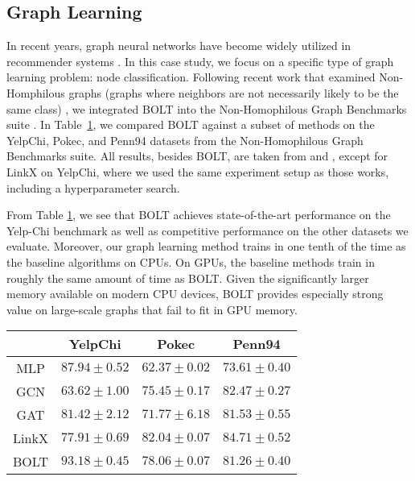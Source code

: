 \documentclass[sigconf]{acmart}
\begin{document}
\subsection{Graph Learning}
In recent years, graph neural networks have become widely utilized in recommender systems \cite{wu2022graph}. In this case study, we focus on a specific type of graph learning problem: node classification. Following recent work that examined Non-Homphilous graphs (graphs where neighbors are not necessarily likely to be the same class) \cite{lim2021large} \cite{lim2021new}, we integrated BOLT into the Non-Homophilous Graph Benchmarks suite \cite{lim2021large}. In Table~\ref{graph-learning}, we compared BOLT against a subset of methods on the YelpChi, Pokec, and Penn94 datasets from the Non-Homophilous Graph Benchmarks suite. All results, besides BOLT, are taken from \cite{lim2021large} and \cite{lim2021new}, except for LinkX on YelpChi, where we used the same experiment setup as those works, including a hyperparameter search. 

From Table \ref{graph-learning}, we see that BOLT achieves state-of-the-art performance on the Yelp-Chi benchmark as well as competitive performance on the other datasets we evaluate. Moreover, our graph learning method trains in one tenth of the time as the baseline algorithms on CPUs. On GPUs, the baseline methods train in roughly the same amount of time as BOLT. Given the significantly larger memory available on modern CPU devices, BOLT provides especially strong value on large-scale graphs that fail to fit in GPU memory.

\begin{table}[h]
\begin{tabular}{|c|c|c|c|}
 \hline  
  & YelpChi & Pokec & Penn94 \\ \hline
MLP & $87.94 \pm 0.52$ & $62.37 \pm 0.02$ & $73.61 \pm 0.40$\\ \hline
GCN & $63.62 \pm 1.00$ & $75.45 \pm 0.17$ & $82.47 \pm 0.27$\\ \hline
GAT & $81.42 \pm 2.12$  & $71.77 \pm 6.18$ & $81.53 \pm 0.55$\\ \hline
LinkX & $77.91 \pm 0.69$ & $82.04 \pm 0.07$ & $84.71 \pm 0.52$ \\ \hline
BOLT & $93.18 \pm 0.45$ & $78.06 \pm 0.07$ & $81.26 \pm 0.40$\\ \hline
\end{tabular}
\label{graph-learning}
\vspace{-0.5cm}
\end{table}
\end{document}
